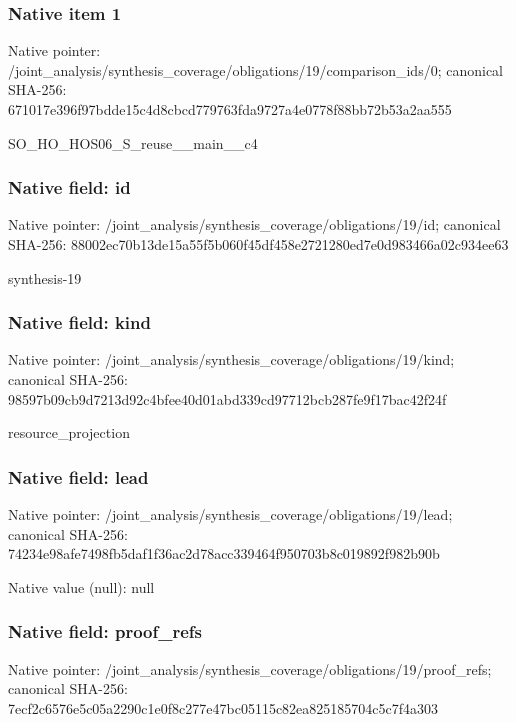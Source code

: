 \documentclass[10pt,a4paper]{article}
\begin{document}
\subsubsection{Native item 1}
Native pointer: /joint\_\allowbreak{}analysis/synthesis\_\allowbreak{}coverage/obligations/19/comparison\_\allowbreak{}ids/0; canonical SHA-256: 671017e396f97bdde15c4d8cbcd779763fda9727a4e0778f88bb72b53a2aa555

\begingroup\raggedright\sloppy SO\_\allowbreak{}HO\_\allowbreak{}HOS06\_\allowbreak{}S\_\allowbreak{}reuse\_\allowbreak{}\_\allowbreak{}main\_\allowbreak{}\_\allowbreak{}c4\par\endgroup

\subsubsection{Native field: id}
Native pointer: /joint\_\allowbreak{}analysis/synthesis\_\allowbreak{}coverage/obligations/19/id; canonical SHA-256: 88002ec70b13de15a55f5b060f45df458e2721280ed7e0d983466a02c934ee63

\begingroup\raggedright\sloppy synthesis-19\par\endgroup

\subsubsection{Native field: kind}
Native pointer: /joint\_\allowbreak{}analysis/synthesis\_\allowbreak{}coverage/obligations/19/kind; canonical SHA-256: 98597b09cb9d7213d92c4bfee40d01abd339cd97712bcb287fe9f17bac42f24f

\begingroup\raggedright\sloppy resource\_\allowbreak{}projection\par\endgroup

\subsubsection{Native field: lead}
Native pointer: /joint\_\allowbreak{}analysis/synthesis\_\allowbreak{}coverage/obligations/19/lead; canonical SHA-256: 74234e98afe7498fb5daf1f36ac2d78acc339464f950703b8c019892f982b90b

Native value (null): null

\subsubsection{Native field: proof\_\allowbreak{}refs}
Native pointer: /joint\_\allowbreak{}analysis/synthesis\_\allowbreak{}coverage/obligations/19/proof\_\allowbreak{}refs; canonical SHA-256: 7ecf2c6576e5c05a2290c1e0f8c277e47bc05115c82ea825185704c5c7f4a303
\end{document}
